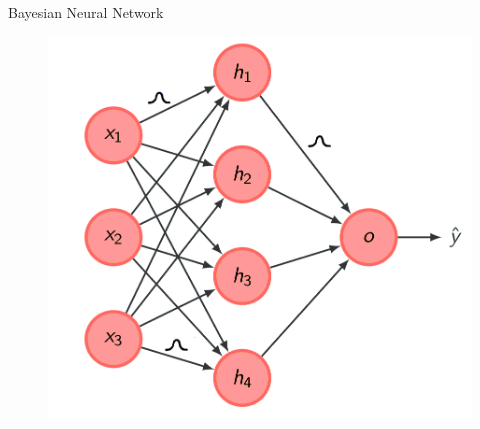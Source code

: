 \documentclass[10pt]{beamer}
\begin{document}
\begin{frame}[fragile]{Bayesian Neural Network}
    \begin{figure}[htp]
        \centering
        \includegraphics[scale=0.3]{images/bayesian_neural_network.png}
    \end{figure}
\end{frame}

\begin{frame}[fragile]
    
\end{frame}
\end{document}

